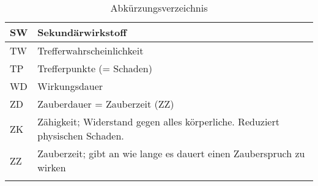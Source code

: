 \begin{longtable}{|p{}|p{}|}
SW & Sekundärwirkstoff \\ \hline
TW & Trefferwahrscheinlichkeit \\ \hline
TP & Trefferpunkte (= Schaden) \\ \hline
WD & Wirkungsdauer \\ \hline
ZD & Zauberdauer = Zauberzeit (ZZ) \\ \hline
ZK & Zähigkeit; Widerstand gegen alles körperliche. Reduziert physischen Schaden. \\ \hline
ZZ & Zauberzeit; gibt an wie lange es dauert einen Zauberspruch zu wirken \\ \hline

\caption{Abkürzungsverzeichnis}
\label{tab:Abkuerungsverzeichnis}
\end{longtable}
